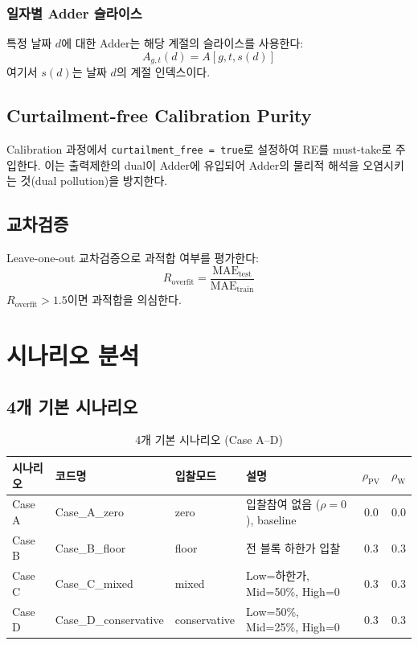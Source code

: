 \documentclass[11pt, a4paper]{article}
\begin{document}
\subsubsection{일자별 Adder 슬라이스}

특정 날짜 $d$에 대한 Adder는 해당 계절의 슬라이스를 사용한다:
\begin{equation}
    A_{g,t}(d) = A[g, t, s(d)]
\end{equation}
여기서 $s(d)$는 날짜 $d$의 계절 인덱스이다.

\subsection{Curtailment-free Calibration Purity}

Calibration 과정에서 \texttt{curtailment\_free = true}로 설정하여
RE를 must-take로 주입한다. 이는 출력제한의 dual이 Adder에 유입되어
Adder의 물리적 해석을 오염시키는 것(dual pollution)을 방지한다.

\subsection{교차검증}

Leave-one-out 교차검증으로 과적합 여부를 평가한다:
\begin{equation}
    R_{\text{overfit}} = \frac{\text{MAE}_{\text{test}}}{\text{MAE}_{\text{train}}}
\end{equation}
$R_{\text{overfit}} > 1.5$이면 과적합을 의심한다.


\section{시나리오 분석}\label{sec:scenarios}

\subsection{4개 기본 시나리오}

\begin{table}[H]
\centering
\caption{4개 기본 시나리오 (Case A--D)}\label{tab:scenarios}
\begin{tabularx}{\textwidth}{lllXcc}
\toprule
\textbf{시나리오} & \textbf{코드명} & \textbf{입찰모드} & \textbf{설명} & $\rho_{\text{PV}}$ & $\rho_{\text{W}}$ \\
\midrule
Case A & Case\_A\_zero         & zero         & 입찰참여 없음 ($\rho=0$), baseline        & 0.0 & 0.0 \\
Case B & Case\_B\_floor        & floor        & 전 블록 하한가 입찰                        & 0.3 & 0.3 \\
Case C & Case\_C\_mixed        & mixed        & Low=하한가, Mid=50\%, High=0               & 0.3 & 0.3 \\
Case D & Case\_D\_conservative & conservative & Low=50\%, Mid=25\%, High=0                 & 0.3 & 0.3 \\
\bottomrule
\end{tabularx}
\end{table}
\end{document}
